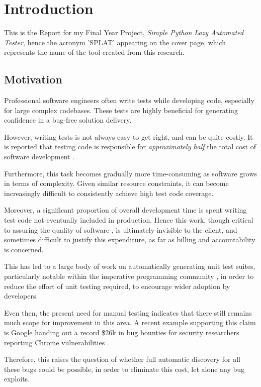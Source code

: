 \chapter{Introduction}
This is the Report for my Final Year Project, \emph{Simple Python Lazy Automated Tester}, hence the acronym '\textsf{SPLAT}' appearing on the cover page, which represents the name of the tool created from this research.
\section{Motivation}	%
Professional software engineers often write tests while developing code, especially for large complex codebases. These tests are highly beneficial for generating confidence in a bug-free solution delivery.

However, writing tests is not always easy to get right, and can be quite costly. It is reported that testing code is responsible for \emph{approximately half} the total cost of software development \cite{Edvardsson99asurvey}\cite{Han2008}\cite{Korel2005}.

Furthermore, this task becomes gradually more time-consuming as software grows in terms of complexity. Given similar resource constraints, it can become increasingly difficult to consistently achieve high test code coverage.

Moreover, a significant proportion of overall development time is spent writing test code not eventually included in production. Hence this work, though critical to assuring the quality of software \cite{Harrold00}, is ultimately invisible to the client, and sometimes difficult to justify this expenditure, as far as billing and accountability is concerned.

This has led to a large body of work on automatically generating unit test suites, particularly notable within the imperative programming community \cite{Allwood2011}, in order to reduce the effort of unit testing required, to encourage wider adoption by developers.

Even then, the present need for manual testing indicates that there still remains much scope for improvement in this area. A recent example supporting this claim is Google handing out a record \$26k in bug bounties for security researchers reporting Chrome vulnerabilities \cite{ChromeBugBounties}.

Therefore, this raises the question of whether full automatic discovery \cite{Bertolino2007} for all these bugs could be possible, in order to eliminate this cost, let alone any bug exploits.
